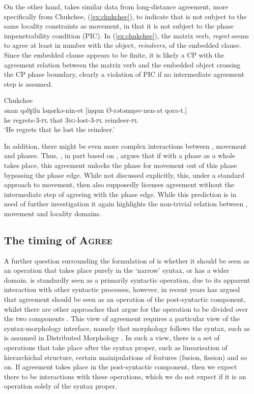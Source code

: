 \documentclass[output=paper
,modfonts
,nonflat]{langsci/langscibook}
\begin{document}
On the other hand, \citet{Boskovic2007} takes similar data from long-distance agreement, more specifically from Chukchee, (\ref{ex:chukchee}), to indicate that \agr{} is not subject to the same locality constraints as movement, in that it is not subject to the phase impenetrability condition (PIC). In (\ref{ex:chukchee}), the matrix verb, \textit{regret} seems to agree at least in number with the object, \textit{reindeers}, of the embedded clause. Since the embedded clause appears to be finite, it is likely a CP with the agreement relation between the matrix verb and the embedded object crossing the CP phase boundary, clearly a violation of PIC if no intermediate agreement step is assumed.
\begin{exe}
	\ex Chukchee \citep{Boskovic2007}\\
	\gll ənan {qəlɣiļu ləŋərkə-nin-et} [iŋqun Ø-rətəmŋəv-nen-at qora-t.]\\
	he regrets-3-\textsc{pl} that \textsc{3sg}-lost-3-\textsc{pl} reindeer-\textsc{pl}\\
	\glt `He regrets that he lost the reindeer.' \label{ex:chukchee} 
\end{exe}
In addition, there might be even more complex interactions between \agr, movement and phases. Thus, \citet{branan2018}, in part based on \citet{rackowskirichards2005}, argues that if \agr {} with a phase as a whole takes place, this agreement unlocks the phase for movement out of this phase bypassing the phase edge.
While not discussed explicitly, this, under a standard approach to movement, then also supposedly licenses agreement without the intermediate step of agreeing with the phase edge. While this prediction is in need of further investigation it again highlights the non-trivial relation between \agr, movement and locality domains.

\subsection{The timing of \textsc{Agree}}
\label{sectiming}

A further question surrounding the formulation of \agr {} is whether it should be seen as an operation that takes place purely in the `narrow' syntax, or has a wider domain. 
\agr {} is standardly seen as a primarily syntactic operation, due to its apparent interaction with other syntactic processes, however, in recent years \cite{Bobaljik2008} has argued that agreement should be seen as an operation of the post-syntactic component, whilst there are other approaches that argue for the operation to be divided over the two components \citep{benmamounetal2009,bhattwalkow2013,marusicetal2015}.
This view of agreement requires a particular view of the syntax-morphology interface, namely that morphology follows the syntax, such as is assumed in Distributed Morphology \citep{hallemarantz1993,arreginevins2012}.
In such a view, there is a set of operations that take place after the syntax proper, such as linearisation of hierarchichal structure, certain mainipulations of features (fusion, fission) and so on.
If agreement takes place in the post-syntactic component, then we expect there to be interactions with these operations, which we do not expect if it is an operation solely of the syntax proper.
\end{document}
